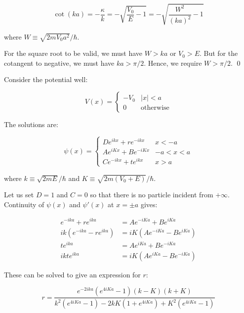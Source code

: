 \documentclass[12pt]{article}
\begin{document}
\begin{equation}
    \cot{(ka)} = -\frac{\kappa}{k} = -\sqrt{\frac{V_{0}}{E} - 1} = -\sqrt{\frac{W^{2}}{(ka)^{2}} - 1}
\end{equation}

where $W \equiv \sqrt{2mV_{0}a^{2}}/\hbar$.

For the square root to be valid, we must have $W > ka$ or $V_{0} > E$. But for the cotangent to negative, we must have $ka > \pi/2$. Hence, we require $W > \pi/2$.
\qed


Consider the potential well:

\begin{equation}
    V(x) =
    \begin{cases}
        -V_{0} & \left\lvert x \right\rvert < a \\
        0 & \text{otherwise}
    \end{cases}
\end{equation}

The solutions are:

\begin{equation}
    \psi(x) =
    \begin{cases}
        De^{ikx} + re^{-ikx} & x < -a \\
        Ae^{iKx} + Be^{-iKx} & -a < x < a \\
        Ce^{-ikx} + te^{ikx} & x > a
    \end{cases}
\end{equation}

where $k \equiv \sqrt{2mE}/\hbar$ and $K \equiv \sqrt{2m(V_{0} + E)}/\hbar$.

Let us set $D = 1$ and $C = 0$ so that there is no particle incident from $+\infty$. Continuity of $\psi(x)$ and $\psi'(x)$ at $x = \pm a$ gives:

\begin{equation}
\begin{split}
    e^{-ika} + re^{ika} &= Ae^{-iKa} + Be^{iKa} \\
    ik(e^{-ika} - re^{ika}) &= iK(Ae^{-iKa} - Be^{iKa}) \\
    te^{ika} &= Ae^{iKa} + Be^{-iKa} \\
    ikt e^{ika} &= iK(Ae^{iKa} - Be^{-iKa})
\end{split}
\end{equation}

These can be solved to give an expression for $r$:

\begin{equation}
    r = \frac{e^{-2ika} \left( e^{4iKa} - 1 \right) (k - K) (k + K)}{k^{2} \left( e^{4iKa} - 1 \right) - 2kK \left( 1 + e^{4iKa} \right) + K^{2} \left( e^{4iKa} - 1 \right)}
\end{equation}
\end{document}
